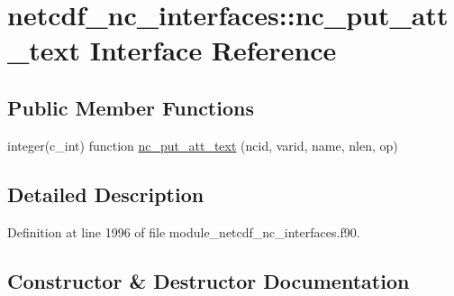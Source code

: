 \hypertarget{interfacenetcdf__nc__interfaces_1_1nc__put__att__text}{}\section{netcdf\+\_\+nc\+\_\+interfaces\+:\+:nc\+\_\+put\+\_\+att\+\_\+text Interface Reference}
\label{interfacenetcdf__nc__interfaces_1_1nc__put__att__text}
\subsection*{Public Member Functions}
\begin{DoxyCompactItemize}
\item 
integer(c\+\_\+int) function \hyperlink{interfacenetcdf__nc__interfaces_1_1nc__put__att__text_ade9d77ab08242df4c9f1b5984bb83759}{nc\+\_\+put\+\_\+att\+\_\+text} (ncid, varid, name, nlen, op)
\end{DoxyCompactItemize}


\subsection{Detailed Description}


Definition at line 1996 of file module\+\_\+netcdf\+\_\+nc\+\_\+interfaces.\+f90.



\subsection{Constructor \& Destructor Documentation}
\mbox{\label{interfacenetcdf__nc__interfaces_1_1nc__put__att__text_ade9d77ab08242df4c9f1b5984bb83759}} 
